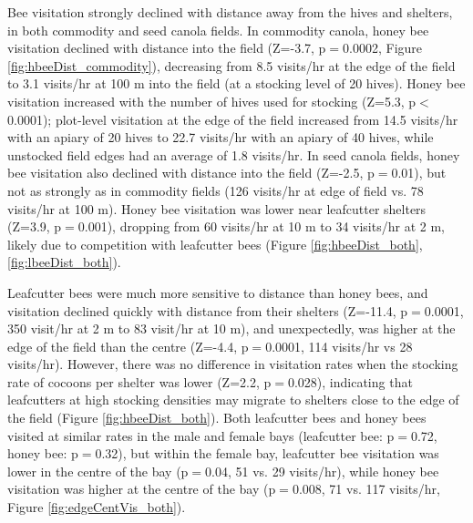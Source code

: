 \documentclass[12pt]{article} %
\begin{document}
Bee visitation strongly declined with distance away from the hives and shelters, in both commodity and seed canola fields. 
In commodity canola, honey bee visitation declined with distance into the field (Z=-3.7, p$=$0.0002, Figure \ref{fig:hbeeDist_commodity}), decreasing from 8.5 visits/hr at the edge of the field to 3.1 visits/hr at 100 m into the field (at a stocking level of 20 hives).
Honey bee visitation increased with the number of hives used for stocking (Z=5.3, p$<$0.0001); plot-level visitation at the edge of the field increased from 14.5 visits/hr with an apiary of 20 hives to 22.7 visits/hr with an apiary of 40 hives, while unstocked field edges had an average of 1.8 visits/hr.
In seed canola fields, honey bee visitation also declined with distance into the field (Z=-2.5, p$=$0.01), but not as strongly as in commodity fields (126 visits/hr at edge of field vs. 78 visits/hr at 100 m). 
Honey bee visitation was lower near leafcutter shelters (Z=3.9, p$=$0.001), dropping from 60 visits/hr at 10 m to 34 visits/hr at 2 m, likely due to competition with leafcutter bees (Figure \ref{fig:hbeeDist_both}, \ref{fig:lbeeDist_both}).

Leafcutter bees were much more sensitive to distance than honey bees, and visitation declined quickly with distance from their shelters (Z=-11.4, p$=$0.0001, 350 visit/hr at 2 m to 83 visit/hr at 10 m), and unexpectedly, was higher at the edge of the field than the centre (Z=-4.4, p$=$0.0001, 114 visits/hr vs 28 visits/hr).
However, there was no difference in visitation rates when the stocking rate of cocoons per shelter was lower (Z=2.2, p$=$0.028), indicating that leafcutters at high stocking densities may migrate to shelters close to the edge of the field (Figure \ref{fig:hbeeDist_both}).
Both leafcutter bees and honey bees visited at similar rates in the male and female bays (leafcutter bee: p$=$0.72, honey bee: p$=$0.32), but within the female bay, leafcutter bee visitation was lower in the centre of the bay (p$=$0.04, 51 vs. 29 visits/hr), while honey bee visitation was higher at the centre of the bay (p$=$0.008, 71 vs. 117 visits/hr, Figure \ref{fig:edgeCentVis_both}).
\end{document}
